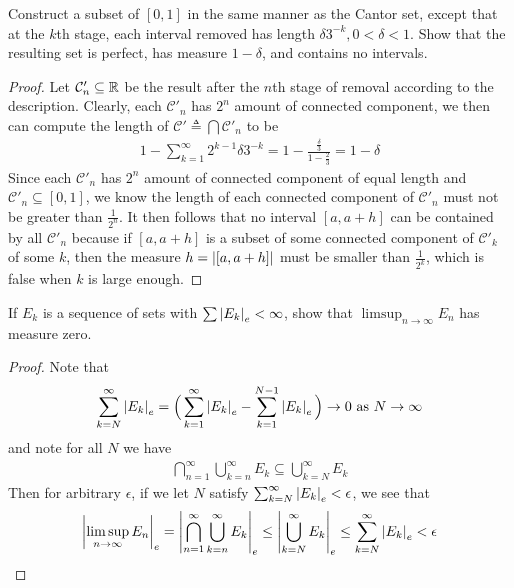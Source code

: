 \documentclass{report}
\begin{document}
\begin{question}{}{}
Construct a subset of $[0,1]$ in the same manner as the Cantor set, except that at the $k$th stage, each interval removed has length  $\delta 3^{-k},0<\delta <1$. Show that the resulting set is perfect, has measure $1-\delta$, and contains no intervals.
\end{question}
\begin{proof}
Let $\mathcal{C}'_n \subseteq \mathbb{R}$ be the result after the $n$th stage of removal according to the description.  Clearly, each $\mathcal{C}'_n$ has $2^n$ amount of connected component, we then can compute the length of $\mathcal{C}'\triangleq \bigcap \mathcal{C}'_n$ to be 
\begin{align*}
1-\sum_{k=1}^{\infty} 2^{k-1}\delta 3^{-k}= 1- \frac{\frac{\delta}{3}}{1-\frac{2}{3}}=1-\delta
\end{align*}
Since each $\mathcal{C}'_n$ has $2^n$ amount of connected component of equal length and $\mathcal{C}'_n \subseteq [0,1]$, we know the length of each connected component of $\mathcal{C}'_n$ must not be greater than $\frac{1}{2^n}$. It then follows that no interval $[a,a+h]$ can be contained by all $\mathcal{C}'_n$ because if $[a,a+h]$ is a subset of some connected component of $\mathcal{C}'_k$ of some $k$, then the measure $h=\left|[a,a+h]\right|$ must be smaller than $\frac{1}{2^k}$, which is false when $k$ is large enough. 
\end{proof}
\begin{question}{}{}
If $E_k$ is a sequence of sets with  $\sum \left|E_k\right|_e < \infty$, show that $\limsup_{n\to\infty} E_n$ has measure zero.
\end{question}
\begin{proof}
Note that  
\begin{align*}
\sum_{k=N}^{\infty} \left|E_k\right|_e = \Big(\sum_{k=1}^{\infty} \left|E_k\right|_e - \sum_{k=1}^{N-1} \left|E_k\right|_e \Big) \to 0\text{ as }N \to \infty
\end{align*}
and note for all $N$ we have 
\begin{align*}
\bigcap_{n=1}^{\infty} \bigcup_{k=n}^{\infty} E_k \subseteq \bigcup_{k=N}^{\infty} E_k
\end{align*}
Then for arbitrary $\epsilon $, if we let $N$ satisfy $\sum_{k=N}^{\infty} \left|E_k\right|_e < \epsilon $, we see that 
\begin{align*}
\left|\limsup_{n\to\infty} E_n\right|_e= \left|\bigcap_{n=1}^{\infty}\bigcup_{k=n}^{\infty}E_k\right|_e\leq \left|\bigcup_{k=N}^{\infty}E_k\right|_e\leq \sum_{k=N}^{\infty} \left|E_k\right|_e < \epsilon 
\end{align*}

\end{proof}
\end{document}
